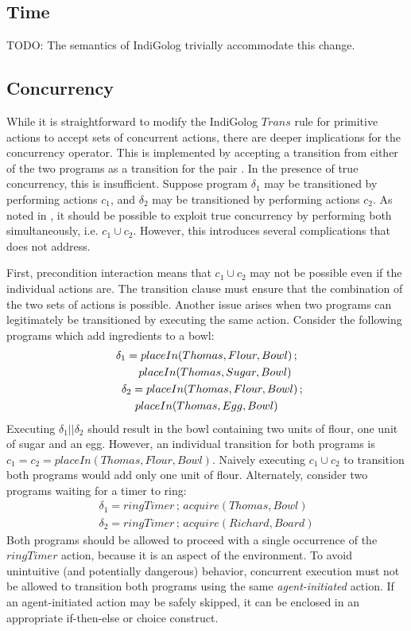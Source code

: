 \subsection{Time}

TODO: The semantics of IndiGolog trivially accommodate this change.


\subsection{Concurrency}

While it is straightforward to modify the IndiGolog $Trans$ rule
for primitive actions to accept sets of concurrent actions, there
are deeper implications for the concurrency operator. This is implemented
by accepting a transition from either of the two programs as a transition
for the pair \citet{giacomo00congolog}. In the presence of true concurrency,
this is insufficient. Suppose program $\delta_{1}$ may be transitioned
by performing actions $c_{1}$, and $\delta_{2}$ may be transitioned
by performing actions $c_{2}$. As noted in \citet{pinto99tcongolog},
it should be possible to exploit true concurrency by performing both
simultaneously, i.e. $c_{1}\cup c_{2}$. However, this introduces
several complications that \citet{pinto99tcongolog} does not address.

First, precondition interaction means that $c_{1}\cup c_{2}$ may
not be possible even if the individual actions are. The transition
clause must ensure that the combination of the two sets of actions
is possible. Another issue arises when two programs can legitimately
be transitioned by executing the same action. Consider the following
programs which add ingredients to a bowl:\begin{multline*}
\delta_{1}=placeIn(Thomas,Flour,Bowl)\,;\\
\shoveright{placeIn(Thomas,Sugar,Bowl)}\\
\shoveleft{\delta_{2}=placeIn(Thomas,Flour,Bowl)\,;}\\
placeIn(Thomas,Egg,Bowl)\end{multline*}
 Executing $\delta_{1}||\delta_{2}$ should result in the bowl containing
two units of flour, one unit of sugar and an egg. However, an individual
transition for both programs is $c_{1}=c_{2}=placeIn(Thomas,Flour,Bowl)$.
Naively executing $c_{1}\cup c_{2}$ to transition both programs would
add only one unit of flour. Alternately, consider two programs waiting
for a timer to ring:\begin{gather*}
\delta_{1}=ringTimer\,;\, acquire(Thomas,Bowl)\\
\delta_{2}=ringTimer\,;\, acquire(Richard,Board)\end{gather*}
 Both programs should be allowed to proceed with a single occurrence
of the $ringTimer$ action, because it is an aspect of the environment.
To avoid unintuitive (and potentially dangerous) behavior, concurrent
execution must not be allowed to transition both programs using the
same \emph{agent-initiated} action. If an agent-initiated action may
be safely skipped, it can be enclosed in an appropriate if-then-else
or choice construct.

